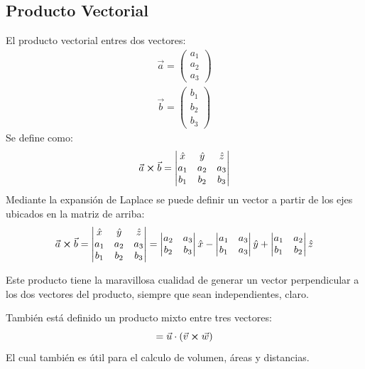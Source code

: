 \documentclass[arial,a4paper,print]{article}
\begin{document}
\subsection{Producto Vectorial}
El producto vectorial entres dos vectores:
\begin{align*}
	\vec{a} = \begin{pmatrix}
		a_{1} \\a_{2}\\a_{3}
	\end{pmatrix} \\ \vec{b} = \begin{pmatrix}
	b_{1}\\b_{2}\\b_{3}
\end{pmatrix}
\end{align*}
Se define como:
\begin{equation*}
	\vec{a}\cross\vec{b} = \begin{vmatrix}
		\hat{x} & \hat{y} & \hat{z} \\
		a_{1} & a_{2} & a_{3} \\
		b_{1} & b_{2} & b_{3}
	\end{vmatrix}
\end{equation*}
Mediante la expansión de Laplace se puede definir un vector a partir de los ejes ubicados en la matriz de arriba:
\begin{equation*}
	\vec{a}\cross\vec{b} = \begin{vmatrix}
		\hat{x} & \hat{y} & \hat{z} \\
		a_{1} & a_{2} & a_{3} \\
		b_{1} & b_{2} & b_{3}
	\end{vmatrix} = \begin{vmatrix}
	a_{2} & a_{3} \\
	b_{2} & b_{3}
\end{vmatrix}\hat{x} - \begin{vmatrix}
	a_{1} & a_{3} \\ b_{1} & a_{3}
\end{vmatrix}\hat{y} + \begin{vmatrix}
	a_{1} & a_{2} \\ b_{1} & b_{2}
\end{vmatrix}\hat{z}
\end{equation*}

Este producto tiene la maravillosa cualidad de generar un vector perpendicular a los dos vectores del producto, siempre que sean independientes, claro. 

También está definido un producto mixto entre tres vectores:
\begin{equation*}
	[\vec{u}, \vec{v}, \vec{w}] = \vec{u}\cdot(\vec{v}\cross\vec{w})
\end{equation*}
El cual también es útil para el calculo de volumen, áreas y distancias. 
\end{document}
